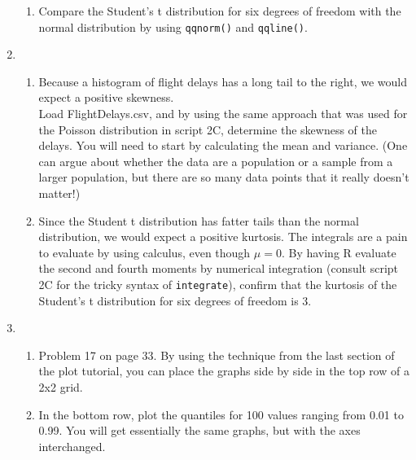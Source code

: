 \documentclass[12pt]{article}
\begin{document}
\begin{enumerate}
\begin{enumerate}
\item Compare the Student's t distribution for six degrees of freedom with the normal distribution by using \verb!qqnorm()! and \verb!qqline()!.

\end{enumerate}

\item 
\begin{enumerate}
\item Because a histogram of flight delays has a long tail to the right, we would expect a positive skewness. \\Load FlightDelays.csv, and by using the same approach that was used for the Poisson distribution in script 2C, determine the skewness of the delays. You will need to start by calculating the mean and variance. (One can argue about whether the data are a population or a sample from a larger population, but there are so many data points that it really doesn't matter!)

\item Since the Student t distribution has fatter tails than the normal distribution, we would expect a positive kurtosis. The integrals are a pain to evaluate by using calculus, even though $\mu = 0$. By having R evaluate the second and fourth moments by numerical integration (consult script 2C for the tricky syntax of \verb!integrate!), confirm that the kurtosis of the Student's t distribution for six degrees of freedom is 3.

\end{enumerate}







\item
\begin{enumerate}

\item  Problem 17 on page 33. By using the technique from the last section of the plot tutorial, you can place the graphs side by side in the top row of a 2x2 grid.
\item In the bottom row, plot the quantiles for 100 values ranging from 0.01 to 0.99. You will get essentially the same graphs, but with the axes interchanged.
\end{enumerate}
\end{enumerate}










\pagebreak
\end{document}
